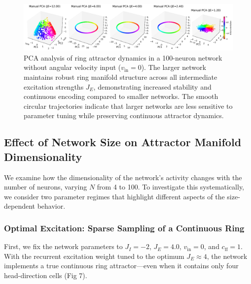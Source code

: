 \documentclass[11pt,a4paper]{article}
\begin{document}

\begin{figure}[H]
\centering
\includegraphics[width=1.0\textwidth]{manual_pca_large_network.png}
\caption{PCA analysis of ring attractor dynamics in a 100-neuron network without angular velocity input (\( v_{\text{in}} = 0 \)). The larger network maintains robust ring manifold structure across all intermediate excitation strengths \( J_E \), demonstrating increased stability and continuous encoding compared to smaller networks. The smooth circular trajectories indicate that larger networks are less sensitive to parameter tuning while preserving continuous attractor dynamics.}
\label{fig:pca_100_neurons}
\end{figure}


\subsection*{Effect of Network Size on Attractor Manifold Dimensionality}

We examine how the dimensionality of the network's activity changes with the number of neurons, varying $N$ from 4 to 100. To investigate this systematically, we consider two parameter regimes that highlight different aspects of the size-dependent behavior.

\subsubsection*{Optimal Excitation: Sparse Sampling of a Continuous Ring}

First, we fix the network parameters to $J_I = -2$, $J_E = 4.0$, $v_{\text{in}} = 0$, and $c_{\text{ff}} = 1$. With the recurrent excitation weight tuned to the optimum $J_E \approx 4$, the network implements a true continuous ring attractor—even when it contains only four head-direction cells (Fig 7). 
\end{document}
